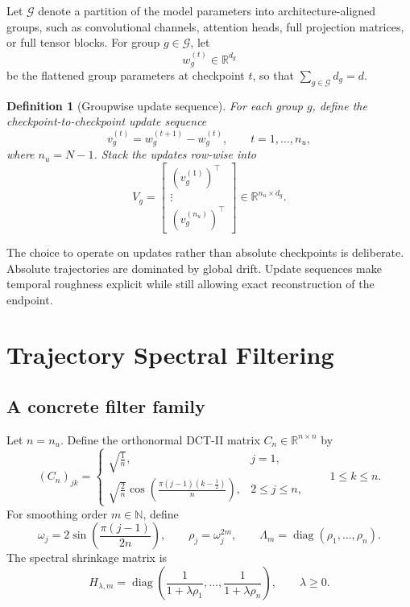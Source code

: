 \documentclass{article}
\newtheorem{definition}{Definition}
\newcommand{\RR}{\mathbb{R}}
\newcommand{\cG}{\mathcal{G}}
\newcommand{\diag}{\operatorname{diag}}
\begin{document}
Let \(\cG\) denote a partition of the model parameters into architecture-aligned groups, such as convolutional channels, attention heads, full projection matrices, or full tensor blocks. For group \(g\in\cG\), let
\[
w_g^{(t)} \in \RR^{d_g}
\]
be the flattened group parameters at checkpoint \(t\), so that \(\sum_{g\in\cG} d_g = d\).

\begin{definition}[Groupwise update sequence]
For each group \(g\), define the checkpoint-to-checkpoint update sequence
\[
v_g^{(t)} = w_g^{(t+1)} - w_g^{(t)}, \qquad t=1,\ldots,n_u,
\]
where \(n_u = N-1\). Stack the updates row-wise into
\[
V_g = 
\begin{bmatrix}
(v_g^{(1)})^\top \\
\vdots \\
(v_g^{(n_u)})^\top
\end{bmatrix}
\in \RR^{n_u \times d_g}.
\]
\end{definition}

The choice to operate on updates rather than absolute checkpoints is deliberate. Absolute trajectories are dominated by global drift. Update sequences make temporal roughness explicit while still allowing exact reconstruction of the endpoint.

\section{Trajectory Spectral Filtering}
\label{sec:method}

\subsection{A concrete filter family}

Let \(n=n_u\). Define the orthonormal DCT-II matrix \(C_n \in \RR^{n\times n}\) by
\begin{equation}
(C_n)_{jk} =
\begin{cases}
\sqrt{\frac{1}{n}}, & j=1, \\
\sqrt{\frac{2}{n}} \cos\!\left( \frac{\pi (j-1)(k-\tfrac12)}{n} \right), & 2\le j\le n,
\end{cases}
\qquad 1\le k\le n.
\label{eq:dct}
\end{equation}
For smoothing order \(m\in\mathbb{N}\), define
\begin{equation}
\omega_j = 2 \sin\!\left( \frac{\pi (j-1)}{2n} \right),
\qquad
\rho_j = \omega_j^{2m},
\qquad
\Lambda_m = \diag(\rho_1,\ldots,\rho_n).
\label{eq:freqs}
\end{equation}
The spectral shrinkage matrix is
\begin{equation}
H_{\lambda,m}
=
\diag\!\left( \frac{1}{1+\lambda \rho_1}, \ldots, \frac{1}{1+\lambda \rho_n} \right),
\qquad \lambda \ge 0.
\label{eq:filter}
\end{equation}
\end{document}
